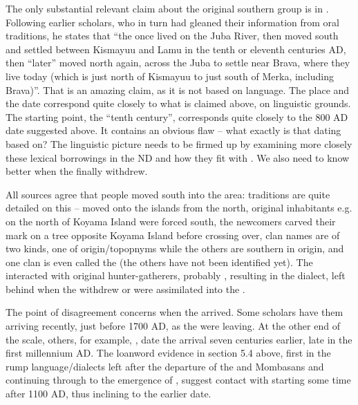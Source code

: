\documentclass[output=paper
,newtxmath
,modfonts
,nonflat]{langsci/langscibook}
\begin{document}
The only substantial relevant claim about the original southern  group is in \citet[15ff]{Lewis1969}. Following earlier  scholars, who in turn had gleaned their information from  oral traditions, he states that “the  once lived on the Juba River, then moved south and settled between Kismayuu and Lamu in the tenth or eleventh centuries AD, then “later” moved north again, across the Juba to settle near Brava, where they live today (which is just north of Kismayuu to just south of Merka, including Brava)”. That is an amazing claim, as it is not based on language. The place and the date correspond quite closely to what is claimed above, on linguistic grounds. The starting point, the “tenth century”, corresponds quite closely to the 800 AD date suggested above. It contains an obvious flaw – what exactly is that dating based on? The linguistic picture needs to be firmed up by examining more closely these lexical borrowings in the ND and how they fit with . We also need to know better when the  finally withdrew.

All sources agree that  people moved south into the area:  traditions are quite detailed on this –  moved onto the islands from the north, original inhabitants e.g. on the north of Koyama Island were forced south, the newcomers carved their mark on a tree opposite Koyama Island before crossing over,  clan names are of two kinds, one of  origin/topopnyms while the others are southern  in origin, and one clan is even called the  (the others have not been identified yet). The  interacted with original hunter-gatherers, probably , resulting in the  dialect, left behind when the  withdrew or were assimilated into the .  

The point of disagreement concerns when the  arrived. Some scholars have them arriving recently, just before 1700 AD, as the  were leaving. At the other end of the scale, others, for example, \citet{Ali1985}, date the  arrival seven centuries earlier, late in the first millennium AD. The loanword evidence in section 5.4 above, first in the rump language/dialects left after the departure of the  and Mombasans and continuing through to the emergence of , suggest contact with  starting some time after 1100 AD, thus inclining to the earlier date.
\end{document}
